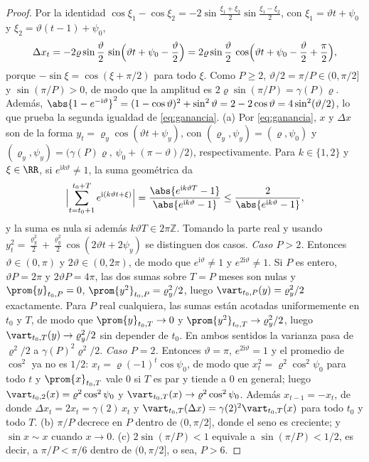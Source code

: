 \begin{proof}
Por la identidad $\cos\xi_1-\cos\xi_2=-2\sin\frac{\xi_1+\xi_2}{2}\sin\frac{\xi_1-\xi_2}{2}$,
con $\xi_1=\vartheta t+\psi_0$ y $\xi_2=\vartheta(t-1)+\psi_0$,
\[
  \Delta x_t=-2\varrho\sin\frac{\vartheta}{2}\,\sin\Bigl(\vartheta t+\psi_0-\frac{\vartheta}{2}\Bigr)
  =2\varrho\sin\frac{\vartheta}{2}\,\cos\Bigl(\vartheta t+\psi_0-\frac{\vartheta}{2}+\frac{\pi}{2}\Bigr),
\]
porque $-\sin\xi=\cos(\xi+\pi/2)$ para todo $\xi$. Como $P\ge2$, $\vartheta/2=\pi/P\in(0,\pi/2]$ y
$\sin(\pi/P)>0$, de modo que la amplitud es $2\varrho\sin(\pi/P)=\gamma(P)\varrho$. Además,
$\abs{1-e^{-\mathrm{i}\vartheta}}^2=(1-\cos\vartheta)^2+\sin^2\vartheta=2-2\cos\vartheta
=4\sin^2(\vartheta/2)$, lo que prueba la segunda igualdad de \cref{eq:ganancia}.
\textup{(a)} Por \cref{eq:ganancia}, $x$ y $\Delta x$ son de la forma
$y_t=\varrho_y\cos(\vartheta t+\psi_y)$, con $(\varrho_y,\psi_y)=(\varrho,\psi_0)$ y
$(\varrho_y,\psi_y)=\bigl(\gamma(P)\varrho,\,\psi_0+(\pi-\vartheta)/2\bigr)$, respectivamente.
Para $k\in\{1, 2\}$ y $\xi\in\RR$, si $e^{\mathrm{i}k\vartheta}\ne1$, la suma geométrica da
\[
  \Bigl\lvert\sum_{t=t_0+1}^{t_0+T}e^{\mathrm{i}(k\vartheta t+\xi)}\Bigr\rvert
  =\frac{\abs{e^{\mathrm{i}k\vartheta T}-1}}{\abs{e^{\mathrm{i}k\vartheta}-1}}
  \le\frac{2}{\abs{e^{\mathrm{i}k\vartheta}-1}},
\]
y la suma es nula si además $k\vartheta T\in2\pi\mathbb{Z}$. Tomando la parte real y usando
$y_t^2=\frac{\varrho_y^2}{2}+\frac{\varrho_y^2}{2}\cos(2\vartheta t+2\psi_y)$ se distinguen dos
casos. \emph{Caso $P>2$.} Entonces $\vartheta\in(0,\pi)$ y $2\vartheta\in(0,2\pi)$, de modo que
$e^{\mathrm{i}\vartheta}\ne1$ y $e^{2\mathrm{i}\vartheta}\ne1$. Si $P$ es entero, $\vartheta P=2\pi$ y
$2\vartheta P=4\pi$, las dos sumas sobre $T=P$ meses son nulas y
$\prom{y}_{t_0,P}=0$, $\prom{y^2}_{t_0,P}=\varrho_y^2/2$, luego
$\vart_{t_0,P}(y)=\varrho_y^2/2$ exactamente. Para $P$ real cualquiera, las sumas están acotadas
uniformemente en $t_0$ y $T$, de modo que $\prom{y}_{t_0,T}\to0$ y
$\prom{y^2}_{t_0,T}\to\varrho_y^2/2$, luego $\vart_{t_0,T}(y)\to\varrho_y^2/2$ sin depender de
$t_0$. En ambos sentidos la varianza pasa de $\varrho^2/2$ a $\gamma(P)^2\varrho^2/2$.
\emph{Caso $P=2$.} Entonces $\vartheta=\pi$, $e^{2\mathrm{i}\vartheta}=1$ y el promedio de
$\cos^2$ ya no es $1/2$: $x_t=\varrho(-1)^t\cos\psi_0$, de modo que $x_t^2=\varrho^2\cos^2\psi_0$
para todo $t$ y $\prom{x}_{t_0,T}$ vale $0$ si $T$ es par y tiende a $0$ en general; luego
$\vart_{t_0,2}(x)=\varrho^2\cos^2\psi_0$ y $\vart_{t_0,T}(x)\to\varrho^2\cos^2\psi_0$. Además
$x_{t-1}=-x_t$, de donde $\Delta x_t=2x_t=\gamma(2)\,x_t$ y
$\vart_{t_0,T}(\Delta x)=\gamma(2)^2\vart_{t_0,T}(x)$ para todo $t_0$ y todo $T$.
\textup{(b)} $\pi/P$ decrece en $P$ dentro de
$(0,\pi/2]$, donde el seno es creciente; y $\sin x\sim x$ cuando $x\to0$. \textup{(c)}
$2\sin(\pi/P)<1$ equivale a $\sin(\pi/P)<1/2$, es decir, a $\pi/P<\pi/6$ dentro de
$(0,\pi/2]$, o sea, $P>6$.
\end{proof}

